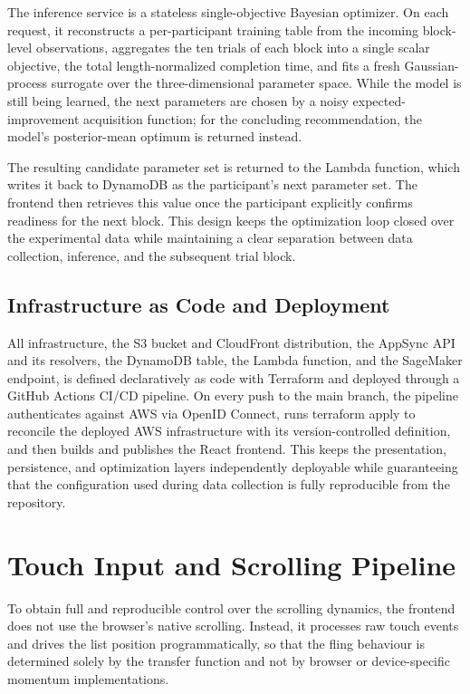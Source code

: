 \documentclass[12pt,a4paper]{report}
\begin{document}
        The inference service is a stateless single-objective Bayesian optimizer. On each request, it reconstructs a per-participant training table from the incoming block-level observations, aggregates the ten trials of each block into a single scalar objective, the total length-normalized completion time, and fits a fresh Gaussian-process surrogate over the three-dimensional parameter space. While the model is still being learned, the next parameters are chosen by a noisy expected-improvement acquisition function; for the concluding recommendation, the model's posterior-mean optimum is returned instead.

        The resulting candidate parameter set is returned to the Lambda function, which writes it back to DynamoDB as the participant's next parameter set. The frontend then retrieves this value once the participant explicitly confirms readiness for the next block. This design keeps the optimization loop closed over the experimental data while maintaining a clear separation between data collection, inference, and the subsequent trial block.

        \subsection{Infrastructure as Code and Deployment}

        All infrastructure, the S3 bucket and CloudFront distribution, the AppSync API and its resolvers, the DynamoDB table, the Lambda function, and the SageMaker endpoint, is defined declaratively as code with Terraform and deployed through a GitHub Actions CI/CD pipeline. On every push to the main branch, the pipeline authenticates against AWS via OpenID Connect, runs terraform apply to reconcile the deployed AWS infrastructure with its version-controlled definition, and then builds and publishes the React frontend. This keeps the presentation, persistence, and optimization layers independently deployable while guaranteeing that the configuration used during data collection is fully reproducible from the repository.

        \section{Touch Input and Scrolling Pipeline}

        To obtain full and reproducible control over the scrolling dynamics, the frontend does not use the browser's native scrolling. Instead, it processes raw touch events and drives the list position programmatically, so that the fling behaviour is determined solely by the transfer function and not by browser or device-specific momentum implementations.
\end{document}
